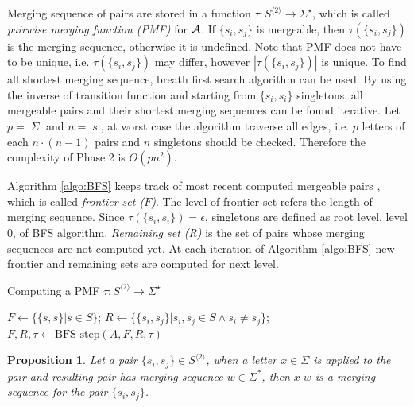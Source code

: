 \documentclass[12pt]{article}
\newtheorem{proposition}{Proposition}[section]
\begin{document}
Merging sequence of pairs are stored in a function $\tau : S^{\langle 2 \rangle} \rightarrow \Sigma^\star$, which is called \textit{pairwise merging function (PMF)} for ${\cal A}$. If $\{ s_i, s_j \}$ is mergeable, then $\tau(\{ s_i, s_j \})$ is the merging sequence, otherwise it is undefined. Note that PMF does not have to be unique, i.e. $\tau(\{ s_i, s_j \})$ may differ, however  $|\tau(\{ s_i, s_j \})|$ is unique. To find all shortest merging sequence, breath first search algorithm can be used. By using the inverse of transition function and starting from $\{ s_i, s_i \}$ singletons, all mergeable pairs and their shortest merging sequences can be found iterative. Let $p=|\Sigma|$ and $n=|s|$, at worst case the algorithm traverse all edges, i.e. $p$ letters of each $n\cdot(n-1)$ pairs and $n$ singletons should be checked. Therefore the complexity of Phase 2 is $O(pn^2)$. 

Algorithm \ref{algo:BFS} keeps track of most recent computed mergeable pairs , which is called \textit{frontier set ($F$)}. The level of frontier set refers the length of merging sequence. Since $\tau(\{ s_i, s_i \})=\epsilon$, singletons are defined as root level, level 0, of BFS algorithm. \textit{Remaining set (R)} is the set of pairs whose merging sequences are not computed yet. At each iteration of Algorithm \ref{algo:BFS} new frontier and remaining sets are computed for next level. 


\begin{algorithm}[ht]
	\caption{Computing a PMF $\tau : S^{\langle 2 \rangle} \rightarrow \Sigma^\star$}
	\label{algo:BFS}
	
	
	$F \longleftarrow \{ \{ s,s \} | s \in S \}$; 
    $R \longleftarrow \{ \{ s_i, s_j \} | s_i,s_j \in S \wedge s_i \neq s_j \}$; 
	{
		$F,R,\tau \longleftarrow \mbox{BFS\_step}(A,F,R,\tau)$\;
	}
\end{algorithm}

\begin{proposition}
	\label{prop:merging}
	Let a pair $\{ s_i,s_j \} \in S^{\langle 2 \rangle}$, when a letter $x \in \Sigma$ is applied to the pair and resulting pair has merging sequence $w \in \Sigma^*$, then $x\;w$ is a merging sequence for the pair $\{s_i,s_j \}$.
\end{proposition}
\end{document}
